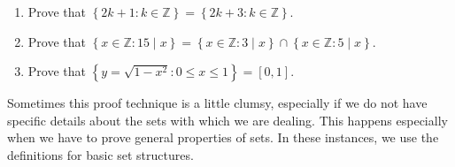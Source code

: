 \documentclass[12 pt]{article}
\newcommand{\Z}{\mathbb{Z}}
\newcommand{\set}[1]{\left\{#1\right\}}
\newcommand{\divides}{\! \mid \!}
\theoremstyle{definition}
\theoremstyle{plain}
\theoremstyle{mytheorem}
\theoremstyle{myexample}
\theoremstyle{mydefinition}
\begin{document}
\begin{enumerate}[resume]
\item Prove that $\set{2k+1: k \in \Z} = \set {2k+3 : k \in \Z}$.

\vspace{4in}

\item Prove that $\set{x \in \Z: 15 \divides x} = \set{x \in \Z: 3 \divides x} \cap \set{x \in \Z: 5 \divides x}$.

\vspace{4in}

\item Prove that $\set{y=\sqrt{1-x^2}: 0 \leq x \leq 1} = [0,1]$.

\vspace{4in}


\end{enumerate}

\noindent  Sometimes this proof technique is a little clumsy, especially if we do not have specific details about the sets with which we are dealing.  This happens especially when we have to prove general properties of sets.  In these instances, we use the definitions for basic set structures.\\
\end{document}
